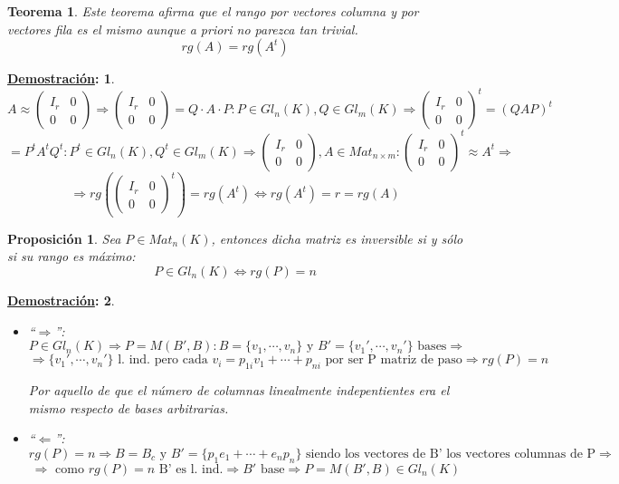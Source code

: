 \documentclass[10pt,a4paper,openright]{book}
\theoremstyle{break}
\newtheorem*{theo}{Teorema}
\newtheorem*{prop}{Proposición}
\newtheorem*{demo}{\underline{Demostración}:}
\begin{document}
\begin{theo}
Este teorema afirma que el rango por vectores columna y por vectores fila es el mismo aunque a priori no parezca tan trivial.
$$rg(A)=rg(A^t)$$
\end{theo}
\begin{demo}
$$A\approx \left(\begin{array}{c|c} I_r & 0  \\ \hline 0 & 0 \end{array}\right)\Rightarrow \left(\begin{array}{c|c} I_r & 0  \\ \hline 0 & 0 \end{array}\right)= Q\cdot A \cdot P: P\in Gl_n(K), Q\in Gl_m(K)\Rightarrow \left(\begin{array}{c|c} I_r & 0  \\ \hline 0 & 0 \end{array}\right)^t= (QAP)^t$$
$$=P^tA^tQ^t: P^t\in Gl_n(K), Q^t\in Gl_m(K)\Rightarrow \left(\begin{array}{c|c} I_r & 0  \\ \hline 0 & 0 \end{array}\right), A\in Mat_{n\times m}: \left(\begin{array}{c|c} I_r & 0  \\ \hline 0 & 0 \end{array}\right)^t \approx A^t \Rightarrow$$
$$\Rightarrow rg\left(\left(\begin{array}{c|c} I_r & 0  \\ \hline 0 & 0 \end{array}\right)^t\right)=rg(A^t)\Leftrightarrow rg(A^t)=r=rg(A)$$
\end{demo}

\begin{prop}
Sea $P\in Mat_n(K)$, entonces dicha matriz es inversible si y sólo si su rango es máximo:
$$P\in Gl_n(K)\Leftrightarrow rg(P)=n$$
\end{prop}
\begin{demo}
\begin{itemize}
\item ``$\Rightarrow $'':
$$P\in Gl_n(K)\Rightarrow P=M(B',B): B=\{v_1, \cdots, v_n\}\mbox{ y }B'=\{v_1', \cdots, v_n'\}\mbox{ bases}\Rightarrow $$
$$\Rightarrow \{v_1',\cdots, v_n'\}\mbox{ l. ind. pero cada }v_i=p_{1i}v_1+\cdots+p_{ni}\mbox{ por ser P matriz de paso}\Rightarrow rg(P)=n$$

Por aquello de que el número de columnas linealmente indepentientes era el mismo respecto de bases arbitrarias.


\item ``$\Leftarrow$'':
$$rg(P)=n\Rightarrow B=B_c \mbox{ y }B'=\{p_1e_1+\cdots+e_np_n\}\mbox{ siendo los vectores de B' los vectores columnas de P}\Rightarrow $$
$$\Rightarrow \mbox{ como }rg(P)=n\mbox{ B' es l. ind.}\Rightarrow B'\mbox{ base}\Rightarrow P=M(B',B)\in Gl_n(K)$$

\end{itemize}
\end{demo}
\end{document}
